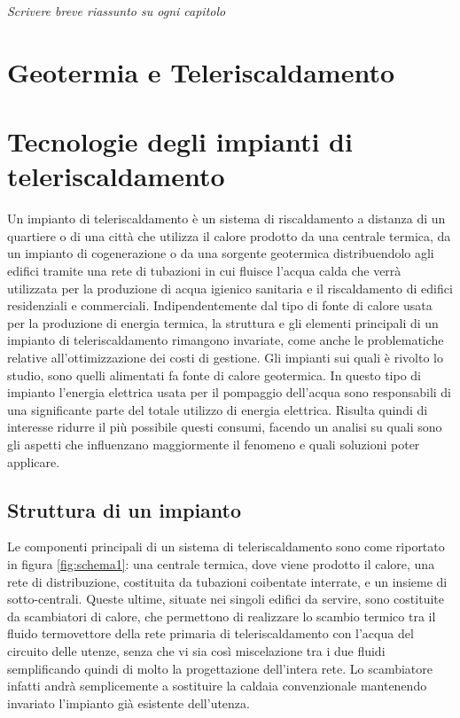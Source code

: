 \documentclass[laurea,oneside,11pt]{USiena_tesiLM}
\begin{document}
\textit{Scrivere breve riassunto su ogni capitolo}

\chapter{Geotermia e Teleriscaldamento}

\chapter{Tecnologie degli impianti di teleriscaldamento}
Un impianto di teleriscaldamento è un  sistema di riscaldamento a distanza di un quartiere o di una città 
che utilizza il calore prodotto da una centrale termica, da un impianto di cogenerazione 
o da una sorgente geotermica distribuendolo agli edifici tramite una rete di tubazioni in cui fluisce l'acqua calda che verrà utilizzata per la produzione di acqua igienico sanitaria e il riscaldamento di edifici residenziali e commerciali. Indipendentemente dal tipo di fonte di calore usata per la produzione di energia termica, la struttura e gli elementi principali di un impianto di teleriscaldamento rimangono invariate, come anche le problematiche relative all'ottimizzazione dei costi di gestione. Gli impianti sui quali è rivolto lo studio, sono quelli alimentati fa fonte di calore geotermica. In questo tipo di impianto l'energia elettrica usata per il pompaggio dell'acqua sono responsabili di una significante parte del totale utilizzo di energia elettrica. Risulta quindi di interesse ridurre il più possibile questi consumi, facendo un analisi su quali sono gli aspetti che influenzano maggiormente il fenomeno e quali soluzioni poter applicare. \\

\section{Struttura di un impianto}
Le componenti principali di un sistema di teleriscaldamento sono come riportato in figura \ref{fig:schema1}: una centrale termica, dove viene prodotto il calore, una rete di distribuzione, costituita da tubazioni 
coibentate interrate, e un insieme di sotto-centrali. Queste ultime, situate nei singoli 
edifici da servire, sono costituite da scambiatori di calore, che permettono di realizzare 
lo scambio termico tra il fluido termovettore  della rete primaria di teleriscaldamento con l'acqua del circuito delle utenze, senza che vi sia così miscelazione tra i due fluidi semplificando quindi di molto la progettazione dell'intera rete. Lo scambiatore infatti andrà semplicemente a sostituire la  caldaia convenzionale mantenendo invariato l'impianto già esistente dell'utenza.
\end{document}
